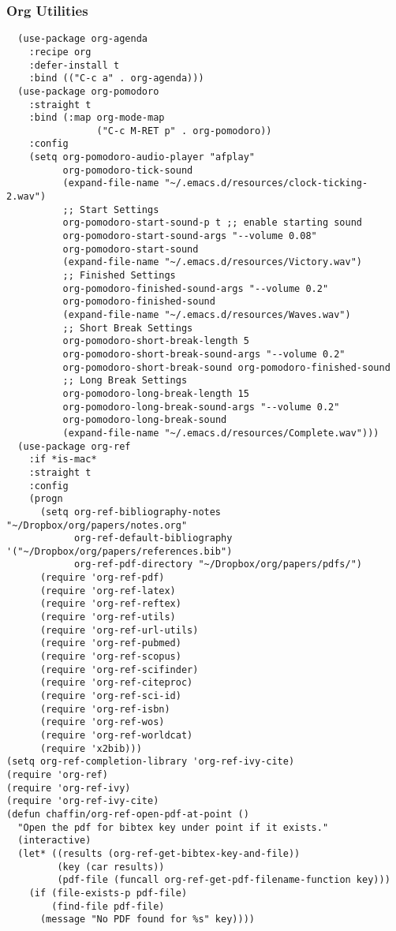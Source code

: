 \documentclass[11pt]{article}
\begin{document}
\subsubsection*{Org Utilities}
\label{sec:orgbc6b7af}

\begin{verbatim}
  (use-package org-agenda
    :recipe org
    :defer-install t
    :bind (("C-c a" . org-agenda)))
  (use-package org-pomodoro
    :straight t
    :bind (:map org-mode-map
                ("C-c M-RET p" . org-pomodoro))
    :config
    (setq org-pomodoro-audio-player "afplay"
          org-pomodoro-tick-sound
          (expand-file-name "~/.emacs.d/resources/clock-ticking-2.wav")
          ;; Start Settings
          org-pomodoro-start-sound-p t ;; enable starting sound
          org-pomodoro-start-sound-args "--volume 0.08"
          org-pomodoro-start-sound
          (expand-file-name "~/.emacs.d/resources/Victory.wav")
          ;; Finished Settings
          org-pomodoro-finished-sound-args "--volume 0.2"
          org-pomodoro-finished-sound
          (expand-file-name "~/.emacs.d/resources/Waves.wav")
          ;; Short Break Settings
          org-pomodoro-short-break-length 5
          org-pomodoro-short-break-sound-args "--volume 0.2"
          org-pomodoro-short-break-sound org-pomodoro-finished-sound
          ;; Long Break Settings
          org-pomodoro-long-break-length 15
          org-pomodoro-long-break-sound-args "--volume 0.2"
          org-pomodoro-long-break-sound
          (expand-file-name "~/.emacs.d/resources/Complete.wav")))
  (use-package org-ref
    :if *is-mac*
    :straight t
    :config
    (progn
      (setq org-ref-bibliography-notes "~/Dropbox/org/papers/notes.org"
            org-ref-default-bibliography '("~/Dropbox/org/papers/references.bib")
            org-ref-pdf-directory "~/Dropbox/org/papers/pdfs/")
      (require 'org-ref-pdf)
      (require 'org-ref-latex)
      (require 'org-ref-reftex)
      (require 'org-ref-utils)
      (require 'org-ref-url-utils)
      (require 'org-ref-pubmed)
      (require 'org-ref-scopus)
      (require 'org-ref-scifinder)
      (require 'org-ref-citeproc)
      (require 'org-ref-sci-id)
      (require 'org-ref-isbn)
      (require 'org-ref-wos)
      (require 'org-ref-worldcat)
      (require 'x2bib)))
(setq org-ref-completion-library 'org-ref-ivy-cite)
(require 'org-ref)
(require 'org-ref-ivy)
(require 'org-ref-ivy-cite)
(defun chaffin/org-ref-open-pdf-at-point ()
  "Open the pdf for bibtex key under point if it exists."
  (interactive)
  (let* ((results (org-ref-get-bibtex-key-and-file))
         (key (car results))
         (pdf-file (funcall org-ref-get-pdf-filename-function key)))
    (if (file-exists-p pdf-file)
        (find-file pdf-file)
      (message "No PDF found for %s" key))))


\end{verbatim}
\end{document}
